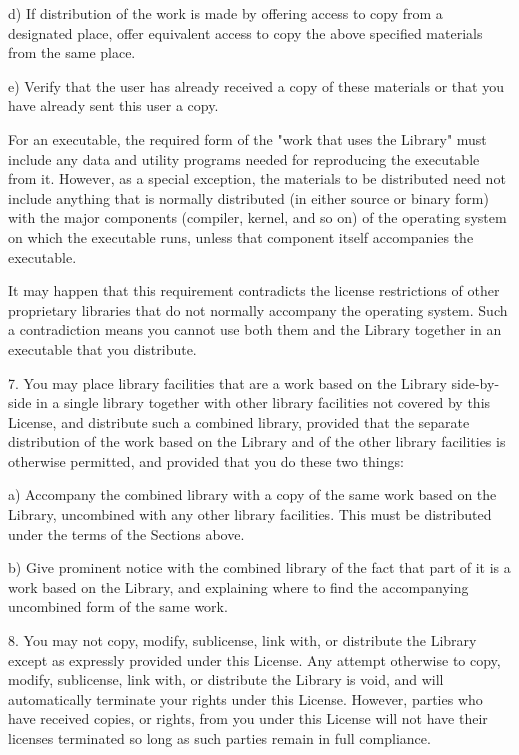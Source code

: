d) If distribution of the work is made by offering access to copy from a designated place, offer equivalent access to copy the above specified materials from the same place.

e) Verify that the user has already received a copy of these materials or that you have already sent this user a copy.

For an executable, the required form of the "work that uses the Library" must include any data and utility programs needed for reproducing the executable from it. However, as a special exception, the materials to be distributed need not include anything that is normally distributed (in either source or binary form) with the major components (compiler, kernel, and so on) of the operating system on which the executable runs, unless that component itself accompanies the executable.

It may happen that this requirement contradicts the license restrictions of other proprietary libraries that do not normally accompany the operating system. Such a contradiction means you cannot use both them and the Library together in an executable that you distribute.

7. You may place library facilities that are a work based on the Library side-by-side in a single library together with other library facilities not covered by this License, and distribute such a combined library, provided that the separate distribution of the work based on the Library and of the other library facilities is otherwise permitted, and provided that you do these two things:

a) Accompany the combined library with a copy of the same work based on the Library, uncombined with any other library facilities. This must be distributed under the terms of the Sections above.

b) Give prominent notice with the combined library of the fact that part of it is a work based on the Library, and explaining where to find the accompanying uncombined form of the same work.

8. You may not copy, modify, sublicense, link with, or distribute the Library except as expressly provided under this License. Any attempt otherwise to copy, modify, sublicense, link with, or distribute the Library is void, and will automatically terminate your rights under this License. However, parties who have received copies, or rights, from you under this License will not have their licenses terminated so long as such parties remain in full compliance.

